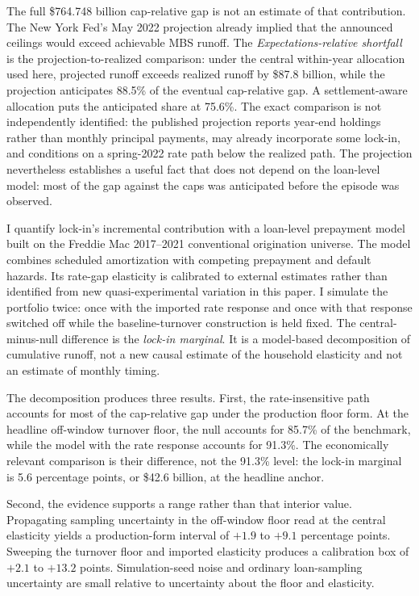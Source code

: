 The full \$764.748 billion cap-relative gap is not an estimate of that contribution. The New York Fed's May 2022 projection already implied that the announced ceilings would exceed achievable MBS runoff. The \emph{Expectations-relative shortfall} is the projection-to-realized comparison: under the central within-year allocation used here, projected runoff exceeds realized runoff by \$87.8 billion, while the projection anticipates 88.5\% of the eventual cap-relative gap. A settlement-aware allocation puts the anticipated share at 75.6\%. The exact comparison is not independently identified: the published projection reports year-end holdings rather than monthly principal payments, may already incorporate some lock-in, and conditions on a spring-2022 rate path below the realized path. The projection nevertheless establishes a useful fact that does not depend on the loan-level model: most of the gap against the caps was anticipated before the episode was observed.

I quantify lock-in's incremental contribution with a loan-level prepayment model built on the Freddie Mac 2017--2021 conventional origination universe. The model combines scheduled amortization with competing prepayment and default hazards. Its rate-gap elasticity is calibrated to external estimates rather than identified from new quasi-experimental variation in this paper. I simulate the portfolio twice: once with the imported rate response and once with that response switched off while the baseline-turnover construction is held fixed. The central-minus-null difference is the \emph{lock-in marginal}. It is a model-based decomposition of cumulative runoff, not a new causal estimate of the household elasticity and not an estimate of monthly timing.

The decomposition produces three results. First, the rate-insensitive path accounts for most of the cap-relative gap under the production floor form. At the headline off-window turnover floor, the null accounts for 85.7\% of the benchmark, while the model with the rate response accounts for 91.3\%. The economically relevant comparison is their difference, not the 91.3\% level: the lock-in marginal is 5.6 percentage points, or \$42.6 billion, at the headline anchor.

Second, the evidence supports a range rather than that interior value. Propagating sampling uncertainty in the off-window floor read at the central elasticity yields a production-form interval of $+1.9$ to $+9.1$ percentage points. Sweeping the turnover floor and imported elasticity produces a calibration box of $+2.1$ to $+13.2$ points. Simulation-seed noise and ordinary loan-sampling uncertainty are small relative to uncertainty about the floor and elasticity.

